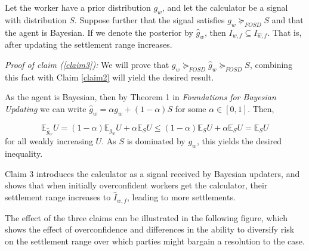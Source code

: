 \begin{claim}
\label{claim3}
Let the worker have a prior distribution $g_w$, and let the calculator be a signal with distribution $S$. Suppose further that the signal satisfies  $g_w \succeq_{FOSD} S$ and that the agent is Bayesian. If we denote the posterior by $\hat{g}_w$, then $I_{w,f} \subseteq I_{\hat{w},f}$. That is, after updating the settlement range increases.
\end{claim}

\textit{Proof of claim (\ref{claim3}):}
We will prove that  $g_w \succeq_{FOSD} \hat{g}_w \succeq_{FOSD} S$, combining this fact with Claim \ref{claim2} will yield the desired result.

As the agent is Bayesian, then by Theorem 1 in \textit{Foundations for Bayesian Updating} we can write $\hat{g}_w=\alpha g_w+(1-\alpha)S$ for some $\alpha\in [0,1]$. Then,

\[\mathbb{E}_{\hat{g}_w}U=(1-\alpha)\mathbb{E}_{g_w}U+\alpha \mathbb{E}_{S}U\leq(1-\alpha)\mathbb{E}_{S}U+\alpha \mathbb{E}_{S}U= \mathbb{E}_{S}U\]
for all weakly increasing $U$. As $S$ is dominated by $g_w$, this yields the desired inequality.


Claim 3 introduces the calculator as a signal received by Bayesian updaters, and shows that when initially overconfident workers get the calculator, their settlement range increases to $\hat{I}_{w,f}$, leading to more settlements.

The effect of the three claims can be illustrated in the following figure, which shows the effect of overconfidence and differences in the ability to diversify risk on the settlement range over which parties might bargain a resolution to the case.  


